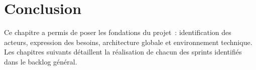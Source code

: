 \section*{Conclusion}

Ce chapitre a permis de poser les fondations du projet~: identification des acteurs, expression des besoins, architecture globale et environnement technique. Les chapitres suivants détaillent la réalisation de chacun des sprints identifiés dans le backlog général.
